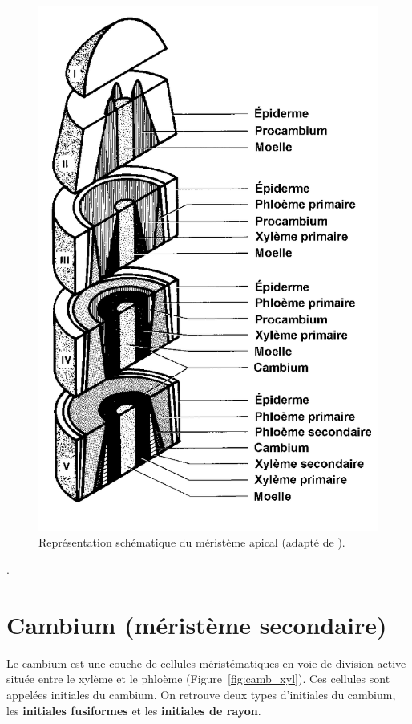 \begin{figure}[h]
	\centering
	\includegraphics[scale=0.3]{img/ch5_apical}
	\caption{Représentation schématique du méristème apical (adapté de \cite{bowyer2007forest}).}
	\label{fig:apical}
\end{figure}.

\section{Cambium (méristème secondaire)}

Le cambium est une couche de cellules méristématiques en voie de division active située entre le xylème et le phloème (Figure~\ref{fig:camb_xyl}). Ces cellules sont appelées initiales du cambium. On retrouve deux types d'initiales du cambium, les \textbf{initiales fusiformes} et les \textbf{initiales de rayon}.

